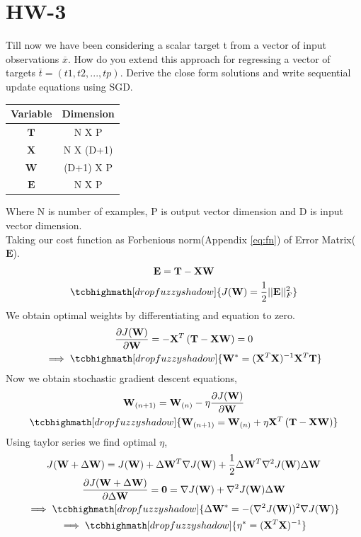 \documentclass{article}
\begin{document}
\section*{\hfil HW-3}
Till now we have been considering a scalar target t from a vector of input observations $\overline{x}$. How do you extend this approach for regressing a vector of targets $\overline{t} = (t1, t2, ..., tp)$. Derive the close form solutions and write sequential update equations using SGD.
\begin{table}[H]
\begin{tabular}{||c|c||}
\hline
Variable & Dimension \\
\hline
$\mathbf{T}$ & N X P \\
\hline
$\mathbf{X}$ & N X (D+1) \\
\hline
$\mathbf{W}$ & (D+1) X P \\
\hline
$\mathbf{E}$ & N X P\\
\hline
\end{tabular}
\end{table}

Where N is number of examples, P is output vector dimension and D is input vector dimension.\\
\newline 
Taking our cost function as Forbenious norm(Appendix \ref{eq:fn}) of Error Matrix($\mathbf{E}$).
\begin{gather*}
\mathbf{E} = \mathbf{T} - \mathbf{XW}\\
\tcbhighmath[drop fuzzy shadow]{J(\mathbf{W}) = \frac{1}{2}||\mathbf{E}||^2_{F}}
\end{gather*}
We obtain optimal weights by differentiating and equation to zero.
\begin{gather*}
\frac{\partial J(\mathbf{W})}{\partial \mathbf{W}} = -\mathbf{X}^T\left(\mathbf{T} - \mathbf{XW}\right) = 0\\
\implies \tcbhighmath[drop fuzzy shadow]{\mathbf{W}^* = (\mathbf{X}^T\mathbf{X})^{-1}\mathbf{X}^T\mathbf{T}}
\end{gather*}
Now we obtain stochastic gradient descent equations,
\begin{gather*}
\mathbf{W}_{(n+1)} = \mathbf{W}_{(n)} - \mathbf{\eta}\frac{\partial J(\mathbf{W})}{\partial \mathbf{W}}\\
\tcbhighmath[drop fuzzy shadow]{\mathbf{W}_{(n+1)} = \mathbf{W}_{(n)} + \mathbf{\eta}\mathbf{X}^T\left(\mathbf{T} - \mathbf{XW}\right)}
\end{gather*}
Using taylor series we find optimal $\eta$,
\begin{gather*}
J(\mathbf{W} + \Delta \mathbf{W}) = J(\mathbf{W}) + \Delta \mathbf{W}^T {\nabla}J(\mathbf{W}) + \frac{1}{2} \Delta \mathbf{W}^T {\nabla}^2J(\mathbf{W})\Delta \mathbf{W}\\
\frac{\partial J(\mathbf{W} + \Delta \mathbf{W})}{\partial \Delta \mathbf{W}} = \mathbf{0} = {\nabla}J(\mathbf{W}) + {\nabla}^2J(\mathbf{W})\Delta \mathbf{W} \\
\implies \tcbhighmath[drop fuzzy shadow]{\Delta \mathbf{W}^* = -({\nabla}^2J(\mathbf{W}))^2{\nabla}J(\mathbf{W})}\\
\implies \tcbhighmath[drop fuzzy shadow]{{\eta}^* = (\mathbf{X}^T\mathbf{X})^{-1}}
\end{gather*}
\end{document}
